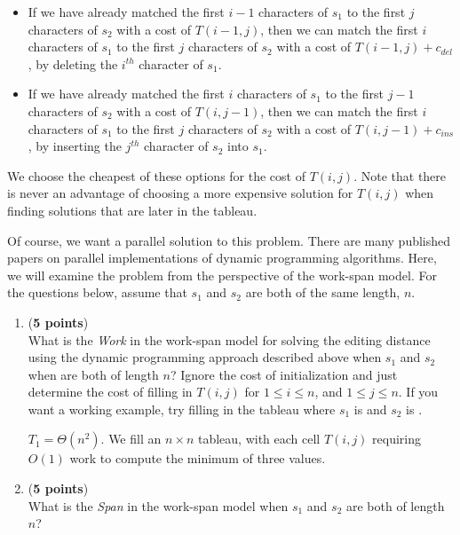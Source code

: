 \documentclass{article}
\newenvironment{answer}
{\color{blue}}
{\normalfont}
\begin{document}
\begin{enumerate}
\begin{itemize}
\begin{itemize}
                              $j^{th}$ character of $s_2$.
                    \end{itemize}
              \item If we have already matched the first $i-1$ characters of $s_1$ to the first $j$ characters of $s_2$
                    with a cost of $T(i-1, j)$,
                    then we can match the first $i$ characters of $s_1$ to the first $j$ characters of $s_2$
                    with a cost of $T(i-1, j) + c_{\mathit{del}}$, by deleting the $i^{th}$ character of $s_1$.
              \item If we have already matched the first $i$ characters of $s_1$ to the first $j-1$ characters of $s_2$
                    with a cost of $T(i, j-1)$,
                    then we can match the first $i$ characters of $s_1$ to the first $j$ characters of $s_2$
                    with a cost of $T(i, j-1) + c_{\mathit{ins}}$, by inserting the $j^{th}$ character of $s_2$ into $s_1$.
          \end{itemize}
          We choose the cheapest of these options for the cost of $T(i, j)$.
          Note that there is never an advantage of choosing a more expensive solution for $T(i, j)$ when finding
          solutions that are later in the tableau.
          \par
          Of course, we want a parallel solution to this problem.
          There are many published papers on parallel implementations of dynamic programming algorithms.
          Here, we will examine the problem from the perspective of the work-span model.
          For the questions below, assume that $s_1$ and $s_2$ are both of the same length, $n$.

          \begin{enumerate}
              \item (\textbf{5 points})\\
                    \label{q:dynamic.work} What is the \emph{Work} in the work-span model for solving the editing distance
                    using the dynamic programming approach described above when $s_1$ and $s_2$ when are both of length $n$?
                    Ignore the cost of initialization and just determine the cost of filling in $T(i,j)$ for
                    $1 \leq i \leq n$, and $1 \leq j \leq n$.
                    If you want a working example, try filling in the tableau where $s_1$ is  and
                    $s_2$ is .

                    \begin{answer}
                        $T_1 = \Theta(n^2)$. We fill an $n \times n$ tableau, with each cell $T(i,j)$ requiring $O(1)$ work to compute the minimum of three values.
                    \end{answer}
              \item (\textbf{5 points})\\
                    \label{q:dynamic.span} What is the \emph{Span} in the work-span model when $s_1$ and $s_2$ are both of
                    length $n$?


\end{enumerate}
\end{enumerate}
\end{document}
